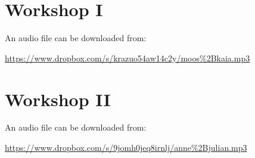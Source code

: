 
\section{Workshop I}
\label{app:workshops-i}

An audio file can be downloaded from:

\url{https://www.dropbox.com/s/krazuo54aw14c2y/moos%2Bkaia.mp3}

\noindent\makebox[\linewidth]{\rule{\textwidth}{0.4pt}}


\section{Workshop II}
\label{app:workshops-ii}

An audio file can be downloaded from:

\url{https://www.dropbox.com/s/9jomh0jeq8irnlj/anne%2Bjulian.mp3}

\noindent\makebox[\linewidth]{\rule{\textwidth}{0.4pt}}

